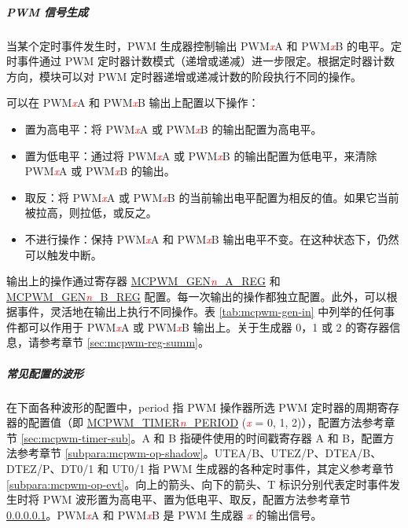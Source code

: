 \documentclass[main\_\_CN.tex]{subfiles}
\begin{document}
\subparagraph{PWM 信号生成}
\label{subpara:mcpwm-op-gen}
当某个定时事件发生时，PWM 生成器控制输出 PWM\textcolor{red}{\it{x}}A 和 PWM\textcolor{red}{\it{x}}B 的电平。定时事件通过 PWM 定时器计数模式（递增或递减）进一步限定。根据定时器计数方向，模块可以对 PWM 定时器递增或递减计数的阶段执行不同的操作。

可以在 PWM\textcolor{red}{\it{x}}A 和 PWM\textcolor{red}{\it{x}}B 输出上配置以下操作：

\begin{itemize}
    \item 置为高电平：将 PWM\textcolor{red}{\it{x}}A 或 PWM\textcolor{red}{\it{x}}B 的输出配置为高电平。
    \item 置为低电平：通过将 PWM\textcolor{red}{\it{x}}A 或 PWM\textcolor{red}{\it{x}}B 的输出配置为低电平，来清除 PWM\textcolor{red}{\it{x}}A 或 PWM\textcolor{red}{\it{x}}B 的输出。
    \item 取反：将 PWM\textcolor{red}{\it{x}}A 或 PWM\textcolor{red}{\it{x}}B 的当前输出电平配置为相反的值。如果它当前被拉高，则拉低，或反之。
    \item 不进行操作：保持 PWM\textcolor{red}{\it{x}}A 和 PWM\textcolor{red}{\it{x}}B 输出电平不变。在这种状态下，仍然可以触发中断。
\end{itemize}

输出上的操作通过寄存器 \hyperref[regdesc:MCPWMGENNAREG]{MCPWM\_GEN\textcolor{red}{\it{n}}\_A\_REG} 和 \hyperref[regdesc:MCPWMGENNBREG]{MCPWM\_GEN\textcolor{red}{\it{n}}\_B\_REG} 配置。每一次输出的操作都独立配置。此外，可以根据事件，灵活地在输出上执行不同操作。表 \ref{tab:mcpwm-gen-in} 中列举的任何事件都可以作用于 PWM\textcolor{red}{\it{x}}A 或 PWM\textcolor{red}{\it{x}}B 输出上。关于生成器 0，1 或 2 的寄存器信息，请参考章节 \ref{sec:mcpwm-reg-summ}。

\subparagraph{常见配置的波形}

在下面各种波形的配置中，period 指 PWM 操作器所选 PWM 定时器的周期寄存器的配置值（即 \hyperref[fielddesc:MCPWMTIMERNPERIOD]{MCPWM\_TIMER\textcolor{red}{\it{n}}\_PERIOD} (\textcolor{red}{\it{x}} = 0, 1, 2)），配置方法参考章节 \ref{sec:mcpwm-timer-sub}。A 和 B 指硬件使用的时间戳寄存器 A 和 B，配置方法参考章节 \ref{subpara:mcpwm-op-shadow}。UTEA/B、UTEZ/P、DTEA/B、DTEZ/P、DT0/1 和 UT0/1 指 PWM 生成器的各种定时事件，其定义参考章节 \ref{subpara:mcpwm-op-evt}。向上的箭头、向下的箭头、T 标识分别代表定时事件发生时将 PWM 波形置为高电平、置为低电平、取反，配置方法参考章节 \ref{subpara:mcpwm-op-gen}。PWM\textcolor{red}{\it{x}}A 和 PWM\textcolor{red}{\it{x}}B 是 PWM 生成器 \textcolor{red}{\it{x}} 的输出信号。
\end{document}
